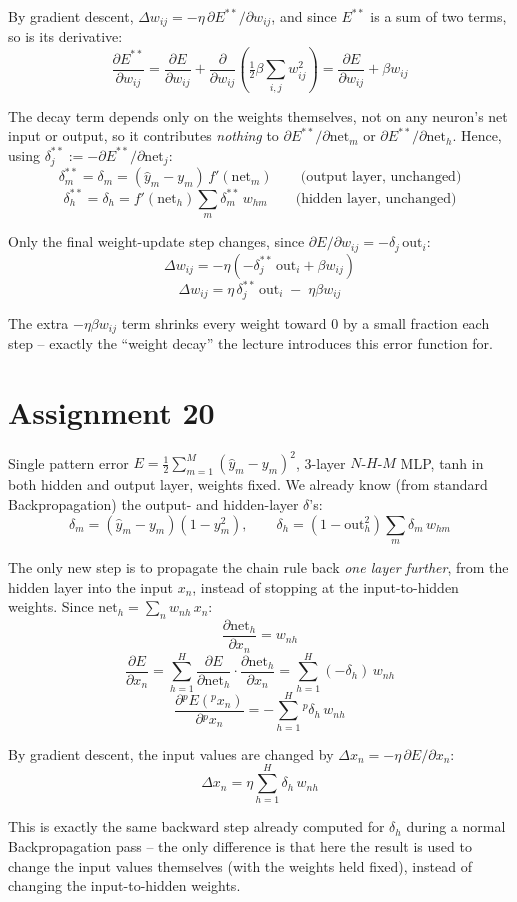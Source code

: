 \documentclass[11pt,a4paper]{article}
\begin{document}
By gradient descent, $\Delta w_{ij} = -\eta\,\partial E^{**}/\partial w_{ij}$, and since $E^{**}$ is a
sum of two terms, so is its derivative:
\[
  \frac{\partial E^{**}}{\partial w_{ij}} = \frac{\partial E}{\partial w_{ij}} + \frac{\partial}{\partial w_{ij}}\left(\tfrac12\beta\sum_{i,j}w_{ij}^2\right)
  = \frac{\partial E}{\partial w_{ij}} + \beta w_{ij}
\]

The decay term depends only on the weights themselves, not on any neuron's net input or output, so
it contributes \emph{nothing} to $\partial E^{**}/\partial \mathrm{net}_m$ or
$\partial E^{**}/\partial \mathrm{net}_h$. Hence, using $\delta_j^{**}:=-\partial E^{**}/\partial \mathrm{net}_j$:
\[
  \boxed{\delta_m^{**} = \delta_m = (\hat y_m-y_m)\,f'(\mathrm{net}_m)} \qquad\text{(output layer, unchanged)}
\]
\[
  \boxed{\delta_h^{**} = \delta_h = f'(\mathrm{net}_h)\sum_m \delta_m^{**}\,w_{hm}} \qquad\text{(hidden layer, unchanged)}
\]

Only the final weight-update step changes, since $\partial E/\partial w_{ij}=-\delta_j\,\mathrm{out}_i$:
\[
  \Delta w_{ij} = -\eta\left(-\delta_j^{**}\,\mathrm{out}_i + \beta w_{ij}\right)
\]
\[
  \boxed{\Delta w_{ij} = \eta\,\delta_j^{**}\,\mathrm{out}_i \;-\; \eta\beta w_{ij}}
\]

The extra $-\eta\beta w_{ij}$ term shrinks every weight toward $0$ by a small fraction each step --
exactly the ``weight decay'' the lecture introduces this error function for.

\section*{Assignment 20}

Single pattern error $E=\tfrac12\sum_{m=1}^{M}(\hat y_m-y_m)^2$, 3-layer $N$-$H$-$M$ MLP, tanh in both
hidden and output layer, weights fixed. We already know (from standard Backpropagation) the output-
and hidden-layer $\delta$'s:
\[
  \delta_m = (\hat y_m-y_m)(1-y_m^2), \qquad
  \delta_h = (1-\mathrm{out}_h^2)\sum_m \delta_m\,w_{hm}
\]

The only new step is to propagate the chain rule back \emph{one layer further}, from the hidden
layer into the input $x_n$, instead of stopping at the input-to-hidden weights. Since
$\mathrm{net}_h = \sum_n w_{nh}\,x_n$:
\[
  \frac{\partial \mathrm{net}_h}{\partial x_n} = w_{nh}
\]
\[
  \frac{\partial E}{\partial x_n} = \sum_{h=1}^{H} \frac{\partial E}{\partial \mathrm{net}_h}\cdot\frac{\partial \mathrm{net}_h}{\partial x_n}
  = \sum_{h=1}^{H} (-\delta_h)\,w_{nh}
\]
\[
  \boxed{\dfrac{\partial {}^pE({}^px_n)}{\partial {}^px_n} = -\sum_{h=1}^{H} {}^p\delta_h\,w_{nh}}
\]

By gradient descent, the input values are changed by $\Delta x_n = -\eta\,\partial E/\partial x_n$:
\[
  \boxed{\Delta x_n = \eta \sum_{h=1}^{H} \delta_h\,w_{nh}}
\]

This is exactly the same backward step already computed for $\delta_h$ during a normal
Backpropagation pass -- the only difference is that here the result is used to change the input
values themselves (with the weights held fixed), instead of changing the input-to-hidden weights.
\end{document}
